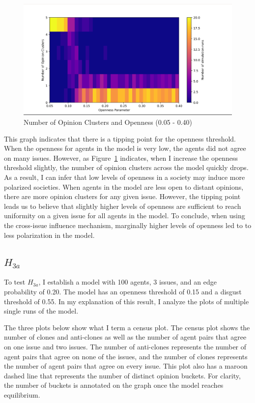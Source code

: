 \begin{figure}
\centering
\includegraphics[width=1.0\columnwidth]{./Graphs/Cluster_opensmall.png}
\caption{Number of Opinion Clusters and Openness (0.05 - 0.40)}
\label{H2b_plot_small}
\end{figure}

This graph indicates that there is a tipping point for the openness threshold.
When the openness for agents in the model is very low, the agents did not agree
on many issues. However, as Figure~\ref{H2b_plot_small} indicates, when I
increase the openness threshold slightly, the number of opinion clusters across
the model quickly drops. As a result, I can infer that low levels of openness
in a society may induce more polarized societies. When agents in the model are
less open to distant opinions, there are more opinion clusters for any given
issue. However, the tipping point leads us to believe that slightly higher
levels of openness are sufficient to reach uniformity on a given issue for all
agents in the model. To conclude, when using the cross-issue influence
mechanism, marginally higher levels of openness led to to less polarization in
the model.

\subsection{$H_{3a}$}

To test $H_{3a}$, I establish a model with 100 agents, 3 issues, and an edge
probability of 0.20. The model has an openness threshold of 0.15 and a disgust threshold of 0.55. In my explanation of this result, I analyze the plots of multiple single runs of the model. 

The three plots below show what I term a census plot. The census plot shows the number of clones and anti-clones as well as the number of agent pairs that agree on one issue and two issues. The number of anti-clones represents the number of agent pairs that agree on none of the issues, and the number of clones represents the number of agent pairs that agree on every issue. This plot also has a maroon dashed line that represents the number of distinct opinion buckets. For clarity, the number of buckets is annotated on the graph once the model reaches equilibrium.

